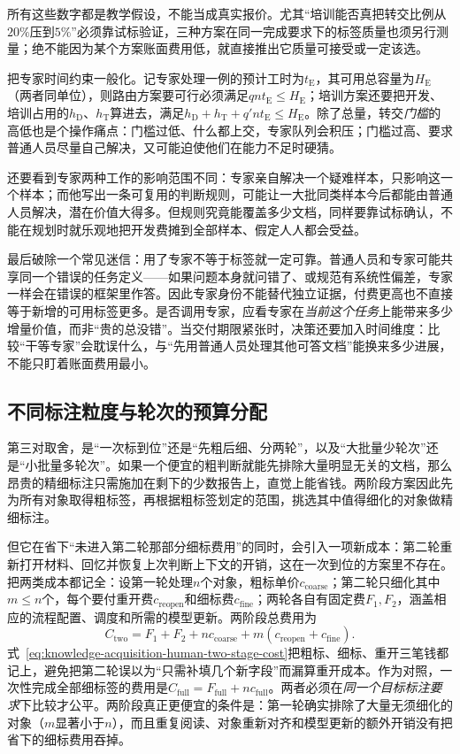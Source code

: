 所有这些数字都是教学假设，不能当成真实报价。尤其“培训能否真把转交比例从$20\%$压到$5\%$”必须靠试标验证，三种方案在同一完成要求下的标签质量也须另行测量；绝不能因为某个方案账面费用低，就直接推出它质量可接受或一定该选。

把专家时间约束一般化。记专家处理一例的预计工时为$t_{\mathrm{E}}$，其可用总容量为$H_{\mathrm{E}}$（两者同单位），则路由方案要可行必须满足$qnt_{\mathrm{E}}\leq H_{\mathrm{E}}$；培训方案还要把开发、培训占用的$h_{\mathrm{D}}$、$h_{\mathrm{T}}$算进去，满足$h_{\mathrm{D}}+h_{\mathrm{T}}+q'nt_{\mathrm{E}}\leq H_{\mathrm{E}}$。除了总量，转交\emph{门槛}的高低也是个操作痛点：门槛过低、什么都上交，专家队列会积压；门槛过高、要求普通人员尽量自己解决，又可能迫使他们在能力不足时硬猜。

还要看到专家两种工作的影响范围不同：专家亲自解决一个疑难样本，只影响这一个样本；而他写出一条可复用的判断规则，可能让一大批同类样本今后都能由普通人员解决，潜在价值大得多。但规则究竟能覆盖多少文档，同样要靠试标确认，不能在规划时就乐观地把开发费摊到全部样本、假定人人都会受益。

最后破除一个常见迷信：用了专家不等于标签就一定可靠。普通人员和专家可能共享同一个错误的任务定义——如果问题本身就问错了、或规范有系统性偏差，专家一样会在错误的框架里作答。因此专家身份不能替代独立证据，付费更高也不直接等于新增的可用标签更多。是否调用专家，应看专家在\emph{当前这个任务}上能带来多少增量价值，而非“贵的总没错”。当交付期限紧张时，决策还要加入时间维度：比较“干等专家”会耽误什么，与“先用普通人员处理其他可答文档”能换来多少进展，不能只盯着账面费用最小。

\subsection{不同标注粒度与轮次的预算分配}
\label{sec:knowledge-acquisition-human-granularity-round-budget}

第三对取舍，是“一次标到位”还是“先粗后细、分两轮”，以及“大批量少轮次”还是“小批量多轮次”。如果一个便宜的粗判断就能先排除大量明显无关的文档，那么昂贵的精细标注只需施加在剩下的少数报告上，直觉上能省钱。两阶段方案因此先为所有对象取得粗标签，再根据粗标签划定的范围，挑选其中值得细化的对象做精细标注。

但它在省下“未进入第二轮那部分细标费用”的同时，会引入一项新成本：第二轮重新打开材料、回忆并恢复上次判断上下文的开销，这在一次到位的方案里不存在。把两类成本都记全：设第一轮处理$n$个对象，粗标单价$c_{\mathrm{coarse}}$；第二轮只细化其中$m\leq n$个，每个要付重开费$c_{\mathrm{reopen}}$和细标费$c_{\mathrm{fine}}$；两轮各自有固定费$F_1,F_2$，涵盖相应的流程配置、调度和所需的模型更新。两阶段总费用为
\begin{equation}
  C_{\mathrm{two}}
  =F_1+F_2+nc_{\mathrm{coarse}}
   +m(c_{\mathrm{reopen}}+c_{\mathrm{fine}}).
  \label{eq:knowledge-acquisition-human-two-stage-cost}
\end{equation}
式~\eqref{eq:knowledge-acquisition-human-two-stage-cost}把粗标、细标、重开三笔钱都记上，避免把第二轮误以为“只需补填几个新字段”而漏算重开成本。作为对照，一次性完成全部细标签的费用是$C_{\mathrm{full}}=F_{\mathrm{full}}+nc_{\mathrm{full}}$。两者必须在\emph{同一个目标标注要求}下比较才公平。两阶段真正更便宜的条件是：第一轮确实排除了大量无须细化的对象（$m$显著小于$n$），而且重复阅读、对象重新对齐和模型更新的额外开销没有把省下的细标费用吞掉。

